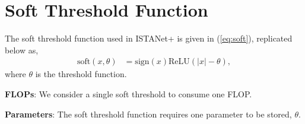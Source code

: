 \section{Soft Threshold Function}

The soft threshold function used in ISTANet+ \cite{ref:zhang2018ista} is given in (\ref{eq:soft}), replicated below as,
\begin{align*}
    \text{soft}(x, \theta) &= \text{sign}(x)\text{ReLU}(|x|-\theta),
\end{align*}
where $\theta$ is the threshold function.

\textbf{FLOPs}: We consider a single soft threshold to consume one FLOP.

\textbf{Parameters}: The soft threshold function requires one parameter to be stored, $\theta$.